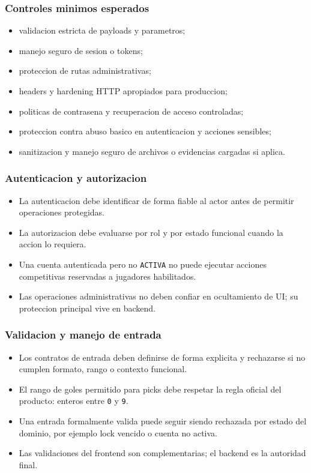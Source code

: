 \subsubsection{Controles minimos esperados}

\begin{itemize}
  \item validacion estricta de payloads y parametros;
  \item manejo seguro de sesion o tokens;
  \item proteccion de rutas administrativas;
  \item headers y hardening HTTP apropiados para produccion;
  \item politicas de contrasena y recuperacion de acceso controladas;
  \item proteccion contra abuso basico en autenticacion y acciones sensibles;
  \item sanitizacion y manejo seguro de archivos o evidencias cargadas si aplica.
\end{itemize}

\subsubsection{Autenticacion y autorizacion}

\begin{itemize}
  \item La autenticacion debe identificar de forma fiable al actor antes de permitir operaciones protegidas.
  \item La autorizacion debe evaluarse por rol y por estado funcional cuando la accion lo requiera.
  \item Una cuenta autenticada pero no \texttt{ACTIVA} no puede ejecutar acciones competitivas reservadas a jugadores habilitados.
  \item Las operaciones administrativas no deben confiar en ocultamiento de UI; su proteccion principal vive en backend.
\end{itemize}

\subsubsection{Validacion y manejo de entrada}

\begin{itemize}
  \item Los contratos de entrada deben definirse de forma explicita y rechazarse si no cumplen formato, rango o contexto funcional.
  \item El rango de goles permitido para picks debe respetar la regla oficial del producto: enteros entre \texttt{0} y \texttt{9}.
  \item Una entrada formalmente valida puede seguir siendo rechazada por estado del dominio, por ejemplo lock vencido o cuenta no activa.
  \item Las validaciones del frontend son complementarias; el backend es la autoridad final.
\end{itemize}

